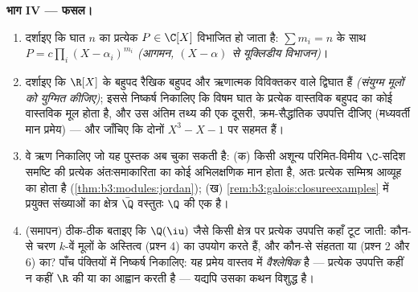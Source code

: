 \begin{problem}
\medskip
\noindent\textbf{भाग IV --- फसल।}
\begin{enumerate}[resume]
  \item दर्शाइए कि घात $n$ का प्रत्येक $P \in \C[X]$ विभाजित हो जाता है:
        $\sum m_i =
        n$ के साथ $P = c\prod_{i}(X - \alpha_i)^{m_i}$ \emph{(आगमन, $(X -
        \alpha)$ से यूक्लिडीय
        विभाजन)}।
  \item दर्शाइए कि $\R[X]$ के  बहुपद रैखिक बहुपद और ऋणात्मक
        विविक्तकर वाले द्विघात हैं \emph{(संयुग्म मूलों को
        युग्मित कीजिए)}; इससे निष्कर्ष निकालिए कि विषम घात के
        प्रत्येक वास्तविक बहुपद का कोई वास्तविक मूल होता है, और
        उस अंतिम तथ्य की एक दूसरी, क्रम-सैद्धांतिक उपपत्ति दीजिए
        (मध्यवर्ती मान प्रमेय) --- और जाँचिए कि दोनों $X^3 - X - 1$ पर
        सहमत हैं।
  \item वे ऋण निकालिए जो यह पुस्तक अब चुका सकती है: (क) किसी
        अशून्य परिमित-विमीय $\C$-सदिश समष्टि की प्रत्येक
        अंतःसमाकारिता का कोई अभिलक्षणिक मान होता है, अतः प्रत्येक
        सम्मिश्र आव्यूह का  होता है (\cref{thm:b3:modules:jordan}); (ख) \cref{rem:b3:galois:closureexamples}
        में प्रयुक्त  संख्याओं का क्षेत्र $\bar\Q$ वस्तुतः
        $\Q$ की एक  है।
  \item (समापन) ठीक-ठीक बताइए कि $\Q(\iu)$ जैसे किसी क्षेत्र पर
        प्रत्येक उपपत्ति कहाँ टूट जाती: कौन-से चरण $k$-वें मूलों
        के अस्तित्व (प्रश्न 4) का उपयोग करते हैं, और कौन-से संहतता
        या  (प्रश्न 2 और 6) का? पाँच पंक्तियों में निष्कर्ष
        निकालिए: यह प्रमेय वास्तव में \emph{वैश्लेषिक} है ---
        प्रत्येक उपपत्ति कहीं न कहीं $\R$ की  या 
        का आह्वान करती है --- यद्यपि उसका कथन विशुद्ध  है।
\end{enumerate}


\end{problem}
